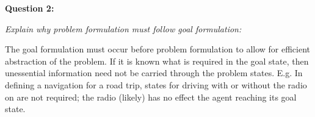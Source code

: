 \noindent\textbf{Question 2:}


\noindent\emph{Explain why problem formulation must follow goal formulation:}


The goal formulation must occur before problem formulation to allow for efficient abstraction of the problem. If it is known what is required in the goal state, then unessential information need not be carried through the problem states. E.g. In defining a navigation for a road trip, states for driving with or without the radio on are not required; the radio (likely) has no effect the agent reaching its goal state.

